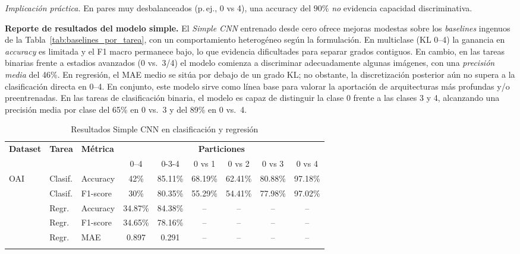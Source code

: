 \documentclass[11pt,spanish,listoffigures,listoftables]{tfgetsinf}
\begin{document}
\noindent\textit{Implicación práctica.} En pares muy desbalanceados (p.\,ej., 0 vs 4), una accuracy del $90\%$ \emph{no} evidencia capacidad discriminativa.



\noindent\textbf{Reporte de resultados del modelo simple.} El \emph{Simple CNN} entrenado desde cero ofrece mejoras modestas sobre los \emph{baselines} ingenuos de la Tabla~\ref{tab:baselines_por_tarea}, con un comportamiento heterogéneo según la formulación. En multiclase (KL 0--4) la ganancia en \textit{accuracy} es limitada y el F1 macro permanece bajo, lo que evidencia dificultades para separar grados contiguos. En cambio, en las tareas binarias frente a estadios avanzados (0 vs.\ 3/4) el modelo comienza a discriminar adecuadamente algunas imágenes, con una \emph{precisión media} del 46\%. En regresión, el MAE medio se sitúa por debajo de un grado KL; no obstante, la discretización posterior aún no supera a la clasificación directa en 0--4. En conjunto, este modelo sirve como línea base para valorar la aportación de arquitecturas más profundas y/o preentrenadas. En las tareas de clasificación binaria, el modelo es capaz de distinguir la clase 0 frente a las clases 3 y 4, alcanzando una precisión media por clase del 65\% en 0 vs.\ 3 y del 89\% en 0 vs.\ 4.


\begin{table}[H]
	\centering
	\caption{Resultados Simple CNN en clasificación y regresión}
	\label{tab:simple_cnn_results_improved}
	\begin{tabular}{@{} l l l c c c c c c @{}}
		\toprule
		\textbf{Dataset} & \textbf{Tarea}                           & \textbf{Métrica}
		                 & \multicolumn{6}{c}{\textbf{Particiones}}                                                                                \\
		\cmidrule(lr){4-9}
		                 &                                          &                  & 0--4    & 0-3-4   & 0 vs 1  & 0 vs 2  & 0 vs 3  & 0 vs 4  \\
		\midrule
		\multirow{2}{*}{OAI}
		                 & Clasif.                                  & Accuracy         & 42\%    & 85.11\% & 68.19\% & 62.41\% & 80.88\% & 97.18\% \\
		                 & Clasif.                                  & F1-score         & 30\%    & 80.35\% & 55.29\% & 54.41\% & 77.98\% & 97.02\% \\
		\addlinespace
		\multirow{3}{*}{OAI}
		                 & Regr.                                    & Accuracy         & 34.87\% & 84.38\% & --      & --      & --      & --      \\
		                 & Regr.                                    & F1-score         & 34.65\% & 78.16\% & --      & --      & --      & --      \\
		                 & Regr.                                    & MAE              & 0.897   & 0.291   & --      & --      & --      & --      \\
		\addlinespace
	\end{tabular}
\end{table}
\end{document}
